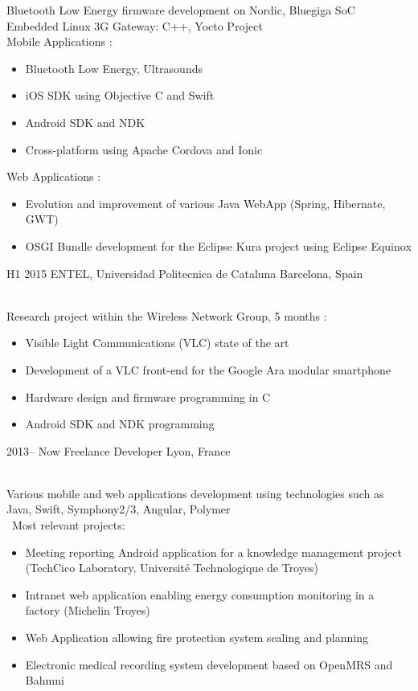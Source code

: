 \documentclass[]{cv-style}          %
\begin{document}
\begin{entrylist}
{\begin{itemize}
  \end{itemize}
  Bluetooth Low Energy firmware development on Nordic, Bluegiga SoC\\
  Embedded Linux 3G Gateway: C++, Yocto Project\\
  Mobile Applications :
  \begin{itemize}
    \item Bluetooth Low Energy, Ultrasounds
    \item iOS SDK using Objective C and Swift
    \item Android SDK and NDK
    \item Cross-platform using Apache Cordova and Ionic
  \end{itemize}
  Web Applications :
  \begin{itemize}
    \item Evolution and improvement of various Java WebApp (Spring, Hibernate, GWT)
    \item OSGI Bundle development for the Eclipse Kura project using Eclipse Equinox
  \end{itemize}}
 \entry
  {H1 2015  }
  {ENTEL, Universidad Politecnica de Cataluna}
  {Barcelona, Spain}
  {\\
  Research project within the Wireless Network Group, 5 months :
  \begin{itemize}
    \item Visible Light Communications (VLC) state of the art
    \item Development of a VLC front-end for the Google Ara modular smartphone
    \item Hardware design and firmware programming in C
    \item Android SDK and NDK programming
  \end{itemize}}
\entry
  {2013-- Now}
  {Freelance Developer}
  {Lyon, France}
  {\\
  Various mobile and web applications development using technologies such as Java, Swift, Symphony2/3, Angular, Polymer\\\
  Most relevant projects:
  \begin{itemize}
    \item Meeting reporting Android application for a knowledge management project (TechCico Laboratory, Université Technologique de Troyes)
    \item Intranet web application enabling energy consumption monitoring in a factory (Michelin Troyes)
    \item Web Application allowing fire protection system scaling and planning
    \item Electronic medical recording system development based on OpenMRS and Bahmni
  \end{itemize}}
\end{entrylist}
\end{document}
